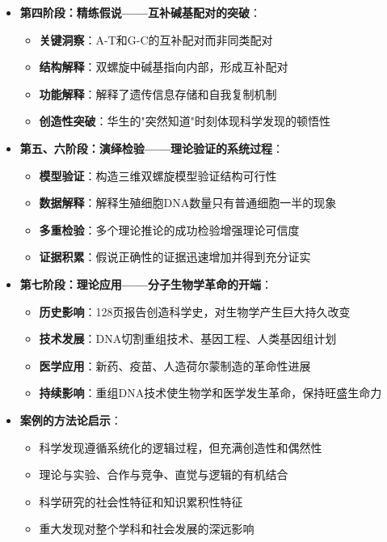 \begin{center}
{{\begin{itemize}
\begin{itemize}
  \end{itemize}
\item \textbf{第四阶段：精练假说——互补碱基配对的突破}：
  \begin{itemize}
  \item \textbf{关键洞察}：A-T和G-C的互补配对而非同类配对
  \item \textbf{结构解释}：双螺旋中碱基指向内部，形成互补配对
  \item \textbf{功能解释}：解释了遗传信息存储和自我复制机制
  \item \textbf{创造性突破}：华生的"突然知道"时刻体现科学发现的顿悟性
  \end{itemize}
\item \textbf{第五、六阶段：演绎检验——理论验证的系统过程}：
  \begin{itemize}
  \item \textbf{模型验证}：构造三维双螺旋模型验证结构可行性
  \item \textbf{数据解释}：解释生殖细胞DNA数量只有普通细胞一半的现象
  \item \textbf{多重检验}：多个理论推论的成功检验增强理论可信度
  \item \textbf{证据积累}：假说正确性的证据迅速增加并得到充分证实
  \end{itemize}
\item \textbf{第七阶段：理论应用——分子生物学革命的开端}：
  \begin{itemize}
  \item \textbf{历史影响}：128页报告创造科学史，对生物学产生巨大持久改变
  \item \textbf{技术发展}：DNA切割重组技术、基因工程、人类基因组计划
  \item \textbf{医学应用}：新药、疫苗、人造荷尔蒙制造的革命性进展
  \item \textbf{持续影响}：重组DNA技术使生物学和医学发生革命，保持旺盛生命力
  \end{itemize}
\item \textbf{案例的方法论启示}：
  \begin{itemize}
  \item 科学发现遵循系统化的逻辑过程，但充满创造性和偶然性
  \item 理论与实验、合作与竞争、直觉与逻辑的有机结合
  \item 科学研究的社会性特征和知识累积性特征
  \item 重大发现对整个学科和社会发展的深远影响
  \end{itemize}
\end{itemize}
}}
\end{center}